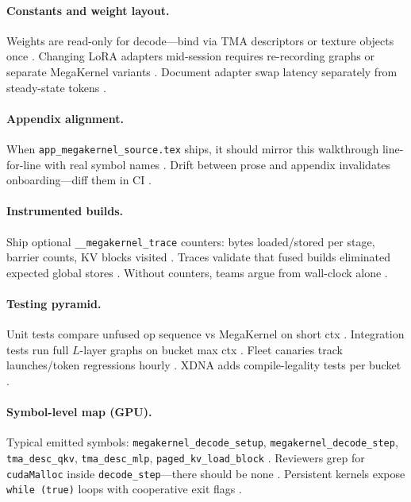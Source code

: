 \paragraph{Constants and weight layout.} Weights are read-only for decode---bind via TMA descriptors or texture objects once \citep{semianalysis2024tma,nvidia2022hopper}. Changing LoRA adapters mid-session requires re-recording graphs or separate MegaKernel variants \citep{patel2025llminference,kwon2023vllm}. Document adapter swap latency separately from steady-state tokens \citep{memoryfloor2026,taxbreak2026}.

\paragraph{Appendix alignment.} When \texttt{app\_megakernel\_source.tex} ships, it should mirror this walkthrough line-for-line with real symbol names \citep{chen2020compilerbasedhardw,yirage2026}. Drift between prose and appendix invalidates onboarding---diff them in CI \citep{patel2025llminference}.

\paragraph{Instrumented builds.} Ship optional \texttt{\_\_megakernel\_trace} counters: bytes loaded/stored per stage, barrier counts, KV blocks visited \citep{taxbreak2026,memoryfloor2026}. Traces validate that fused builds eliminated expected global stores \citep{semianalysis2024tma,yirage2026}. Without counters, teams argue from wall-clock alone \citep{patel2025llminference,dao2022flashattention}.

\paragraph{Testing pyramid.} Unit tests compare unfused op sequence vs MegaKernel on short ctx \citep{dao2022flashattention}. Integration tests run full $L$-layer graphs on bucket max ctx \citep{kwon2023vllm,nvidia2024cudagraphs}. Fleet canaries track launches/token regressions hourly \citep{taxbreak2026,memoryfloor2026}. XDNA adds compile-legality tests per bucket \citep{amd2024aie,amd2024xdna}.

\paragraph{Symbol-level map (GPU).} Typical emitted symbols: \texttt{megakernel\_decode\_setup}, \texttt{megakernel\_decode\_step}, \texttt{tma\_desc\_qkv}, \texttt{tma\_desc\_mlp}, \texttt{paged\_kv\_load\_block} \citep{yirage2026,semianalysis2024tma}. Reviewers grep for \texttt{cudaMalloc} inside \texttt{decode\_step}---there should be none \citep{memoryfloor2026,kwon2023vllm}. Persistent kernels expose \texttt{while (true)} loops with cooperative exit flags \citep{nvidia2024cudagraphs,taxbreak2026}.

